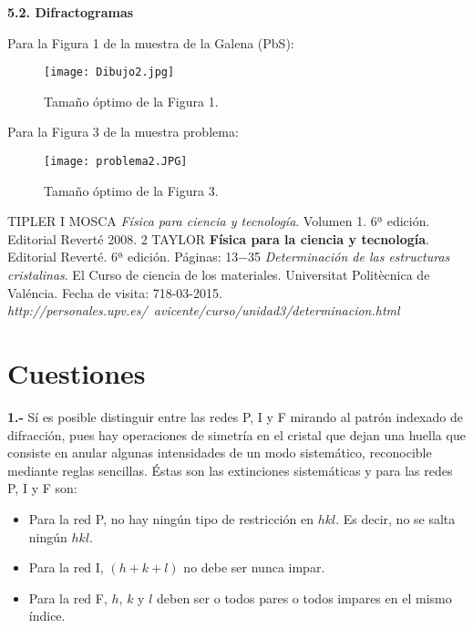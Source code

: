 \documentclass[a4paper,twocolumn,10pt]{article}
\begin{document}
\newpage
 
\textbf{5.2. Difractogramas}


Para la Figura 1 de la muestra de la Galena (PbS):
\begin{figure}[H]
\centering
\texttt{[image: Dibujo2.jpg]}
\caption{Tamaño óptimo de la Figura 1.} 
\label{Figura 1:Dibujo2}
\end{figure}

Para la Figura 3 de la muestra problema: 
 \begin{figure}[H]
\centering
\texttt{[image: problema2.JPG]}
\caption{Tamaño óptimo de la Figura 3.} 
\label{Figura 1:Dibujo}
\end{figure}

\begin{thebibliography}{99}


 TIPLER I MOSCA \textit{Física para ciencia y tecnología}. Volumen 1. 6ª edición. Editorial Reverté  2008. 2
 TAYLOR \textbf{Física para la ciencia y tecnología}. Editorial Reverté. 6ª edición. Páginas: 13$-$35
  \textit{Determinación de las estructuras cristalinas}. El Curso de ciencia de los materiales. Universitat Politècnica de Valéncia. Fecha de visita: 718-03-2015. \textit{ http://personales.upv.es/~avicente/curso/unidad3/determinacion.html }
\end{thebibliography}

\newpage

\section{Cuestiones}

\textbf{1.- } Sí es posible distinguir entre las redes P, I y F mirando al patrón indexado de difracción, pues hay operaciones de simetría en el cristal que dejan una huella que consiste en anular algunas intensidades de un modo sistemático, reconocible mediante reglas sencillas. Éstas son las extinciones sistemáticas  y para las redes P, I y F son: 

\begin{itemize}
\item Para la red P, no hay ningún tipo de restricción en $hkl$. Es decir, no se salta ningún $hkl$.
\item Para la red I, $(h + k + l)$ no debe ser nunca impar.
\item Para la red F, $h$, $k$ y $l$ deben ser o todos pares o todos impares en el mismo índice.
\end{itemize}
\end{document}
